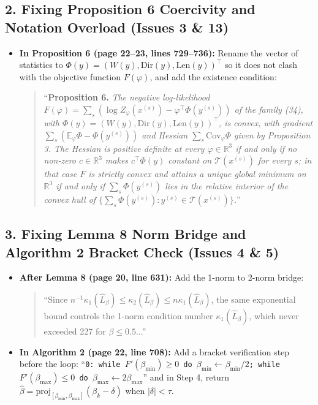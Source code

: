 \documentclass[11pt,a4paper]{article}
\begin{document}
\subsection*{2. Fixing Proposition 6 Coercivity and Notation Overload (Issues 3 \& 13)}
\begin{itemize}
    \item \textbf{In Proposition 6 (page 22--23, lines 729--736):} Rename the vector of statistics to $\Phi(y) = (W(y), \mathrm{Dir}(y), \mathrm{Len}(y))^\top$ so it does not clash with the objective function $F(\varphi)$, and add the existence condition:
    \begin{quote}
        ``\textbf{Proposition 6.} \textit{The negative log-likelihood $F(\varphi) = \sum_s (\log Z_\varphi(x^{(s)}) - \varphi^\top \Phi(y^{(s)}))$ of the family (34), with $\Phi(y) = (W(y), \mathrm{Dir}(y), \mathrm{Len}(y))^\top$, is convex, with gradient $\sum_s (\mathbb{E}_\varphi \Phi - \Phi(y^{(s)}))$ and Hessian $\sum_s \mathrm{Cov}_\varphi \Phi$ given by Proposition 3. The Hessian is positive definite at every $\varphi \in \mathbb{R}^3$ if and only if no non-zero $c \in \mathbb{R}^3$ makes $c^\top \Phi(y)$ constant on $\mathcal{T}(x^{(s)})$ for every $s$; in that case $F$ is strictly convex and attains a unique global minimum on $\mathbb{R}^3$ if and only if $\sum_s \Phi(y^{(s)})$ lies in the relative interior of the convex hull of $\{\sum_s \Phi(y^{(s)}) : y^{(s)} \in \mathcal{T}(x^{(s)})\}$.}''
    \end{quote}
\end{itemize}

\subsection*{3. Fixing Lemma 8 Norm Bridge and Algorithm 2 Bracket Check (Issues 4 \& 5)}
\begin{itemize}
    \item \textbf{After Lemma 8 (page 20, line 631):} Add the 1-norm to 2-norm bridge:
    \begin{quote}
        ``Since $n^{-1}\kappa_1(\widehat{L}_\beta) \le \kappa_2(\widehat{L}_\beta) \le n\kappa_1(\widehat{L}_\beta)$, the same exponential bound controls the 1-norm condition number $\kappa_1(\widehat{L}_\beta)$, which never exceeded 227 for $\beta \le 0.5$...''
    \end{quote}
    \item \textbf{In Algorithm 2 (page 22, line 708):} Add a bracket verification step before the loop: ``\texttt{0: while $F'(\beta_{\min}) \ge 0$ do $\beta_{\min} \leftarrow \beta_{\min}/2$; while $F'(\beta_{\max}) \le 0$ do $\beta_{\max} \leftarrow 2\beta_{\max}$}'' and in Step 4, return $\hat{\beta} = \mathrm{proj}_{[\beta_{\min},\beta_{\max}]}(\beta_k - \delta)$ when $|\delta| < \tau$.
\end{itemize}
\end{document}
